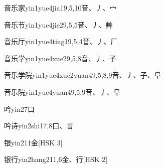 \begin{EntryWithPhonetic}{音乐家}{yin1yue4jia1}{9,5,10}{⾳、⼃、⼧}
\end{EntryWithPhonetic}

\begin{EntryWithPhonetic}{音乐节}{yin1yue4jie2}{9,5,5}{⾳、⼃、⾋}
\end{EntryWithPhonetic}

\begin{EntryWithPhonetic}{音乐厅}{yin1yue4ting1}{9,5,4}{⾳、⼃、⼚}
\end{EntryWithPhonetic}

\begin{EntryWithPhonetic}{音乐学}{yin1yue4xue2}{9,5,8}{⾳、⼃、⼦}
\end{EntryWithPhonetic}

\begin{EntryWithPhonetic}{音乐学院}{yin1yue4xue2yuan4}{9,5,8,9}{⾳、⼃、⼦、⾩}
\end{EntryWithPhonetic}

\begin{EntryWithPhonetic}{音乐院}{yin1yue4yuan4}{9,5,9}{⾳、⼃、⾩}
\end{EntryWithPhonetic}

\begin{EntryWithPhonetic}{吟}{yin2}{7}{⼝}
\end{EntryWithPhonetic}

\begin{EntryWithPhonetic}{吟诗}{yin2shi1}{7,8}{⼝、⾔}
\end{EntryWithPhonetic}

\begin{EntryWithPhonetic}{银}{yin2}{11}{⾦}[HSK 3]
\end{EntryWithPhonetic}

\begin{EntryWithPhonetic}{银行}{yin2hang2}{11,6}{⾦、⾏}[HSK 2]
\end{EntryWithPhonetic}

